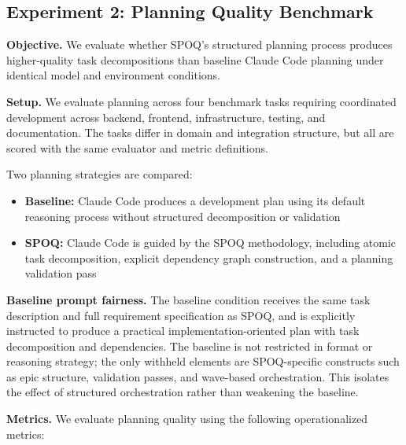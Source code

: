 \subsection{Experiment 2: Planning Quality Benchmark}

\textbf{Objective.}
We evaluate whether SPOQ's structured planning process produces higher-quality task decompositions than baseline Claude Code planning under identical model and environment conditions.

\textbf{Setup.}
We evaluate planning across four benchmark tasks requiring coordinated development across backend, frontend, infrastructure, testing, and documentation. The tasks differ in domain and integration structure, but all are scored with the same evaluator and metric definitions.

Two planning strategies are compared:

\begin{itemize}
    \item \textbf{Baseline:} Claude Code produces a development plan using its default reasoning process without structured decomposition or validation
    \item \textbf{SPOQ:} Claude Code is guided by the SPOQ methodology, including atomic task decomposition, explicit dependency graph construction, and a planning validation pass
\end{itemize}

\textbf{Baseline prompt fairness.}
The baseline condition receives the same task description and full requirement specification as SPOQ, and is explicitly instructed to produce a practical implementation-oriented plan with task decomposition and dependencies. The baseline is not restricted in format or reasoning strategy; the only withheld elements are SPOQ-specific constructs such as epic structure, validation passes, and wave-based orchestration. This isolates the effect of structured orchestration rather than weakening the baseline.

\textbf{Metrics.}
We evaluate planning quality using the following operationalized metrics:

